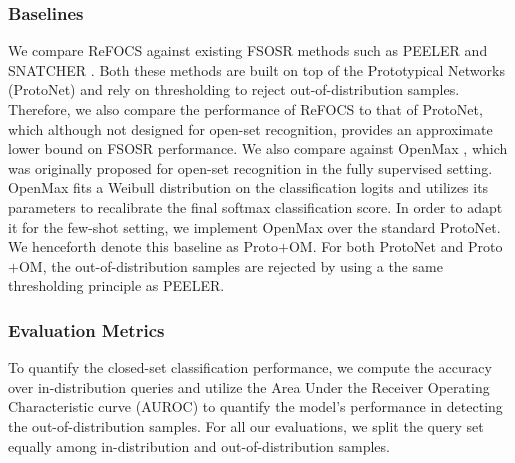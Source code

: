 




\subsubsection*{Baselines} We compare ReFOCS against existing FSOSR methods such as PEELER \cite{peeler} and SNATCHER \cite{snatcher}. Both these methods are built on top of the Prototypical Networks (ProtoNet) \cite{proto_net} and rely on thresholding to reject out-of-distribution samples. Therefore, we also compare the performance of ReFOCS to that of ProtoNet, which although not designed for open-set recognition, provides an approximate lower bound on FSOSR performance. We also compare against OpenMax \cite{open_max}, which was originally proposed for open-set recognition in the fully supervised setting. OpenMax fits a Weibull distribution on the classification logits and utilizes its parameters to recalibrate the final softmax classification score. In order to adapt it for the few-shot setting, we implement OpenMax over the standard ProtoNet. We henceforth denote this baseline as Proto$+$OM. For both ProtoNet and Proto$+$OM, the out-of-distribution samples are rejected by using a the same thresholding principle as PEELER.  



\subsubsection*{Evaluation Metrics} To quantify the closed-set classification performance, we compute the accuracy over in-distribution queries and utilize the Area Under the Receiver Operating Characteristic curve (AUROC) to quantify the model's performance in detecting the out-of-distribution samples. For all our evaluations, we split the query set equally among in-distribution and out-of-distribution samples.



